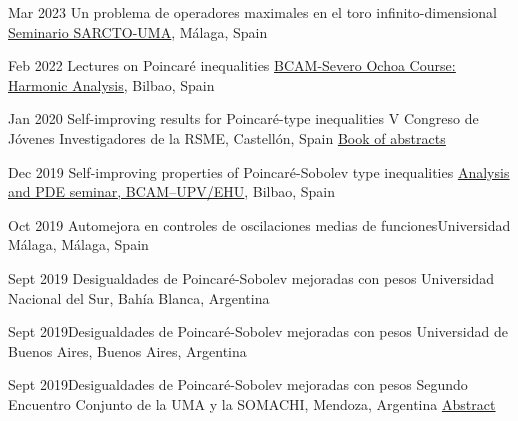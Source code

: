 \begin{talk}
  {Mar 2023}
  {Un problema de operadores maximales
  en el toro infinito-dimensional}
  {\href{https://sites.google.com/view/sarctouma}{\underline{Seminario SARCTO-UMA}}, M\'alaga, Spain}
  { }  
\end{talk}


\begin{talk}
  {Feb 2022}
  {Lectures on Poincar\'e inequalities}
  {\href{http://www.bcamath.org/en/courses/bcamseveroochoacourse20220110}{\underline{BCAM-Severo Ochoa Course: Harmonic Analysis}}, Bilbao, Spain}
  { }  
\end{talk}


\begin{talk}
    {Jan 2020}
    {Self-improving results for Poincar\'e-type inequalities}
    {V Congreso de J\'ovenes Investigadores de la RSME, Castell\'on, Spain}
    {\href{https://jovenesrsme2020.com/wp-content/uploads/2020/01/libro_resumenes_definitivo.pdf}{\underline{Book of abstracts}}\\}
  \end{talk}

  \begin{talk}
    {Dec 2019}
    {Self-improving properties of Poincar\'e-Sobolev type inequalities}
    {\href{http://shorturl.at/hlnA7}{\underline{Analysis and PDE seminar, BCAM--UPV/EHU}}, Bilbao, Spain}
    { }  
  \end{talk}
 
      
   \begin{talk}
    {Oct 2019}
    {Automejora en controles de oscilaciones medias de funciones}{Universidad M\'alaga, M\'alaga, Spain}
    { }
  \end{talk}
       
      
      \begin{talk}   
      {Sept 2019}
      {Desigualdades de Poincar\'e-Sobolev mejoradas con pesos}
      {Universidad Nacional del Sur, Bah\'ia Blanca, Argentina}
      { }
  \end{talk}
      
    \begin{talk}{Sept 2019}{Desigualdades de Poincar\'e-Sobolev mejoradas con pesos}
    {Universidad de Buenos Aires,  Buenos Aires, Argentina}
    { }
  \end{talk}
      
      
      
    \begin{talk}
    {Sept 2019}{Desigualdades de Poincar\'e-Sobolev mejoradas con pesos}
    {Segundo Encuentro Conjunto de la UMA y la SOMACHI, Mendoza, Argentina}
    {\href{http://www.union-matematica.org.ar/suma2019/files/02-2-005.pdf}{ \underline{Abstract}}\\}
  \end{talk}
 
